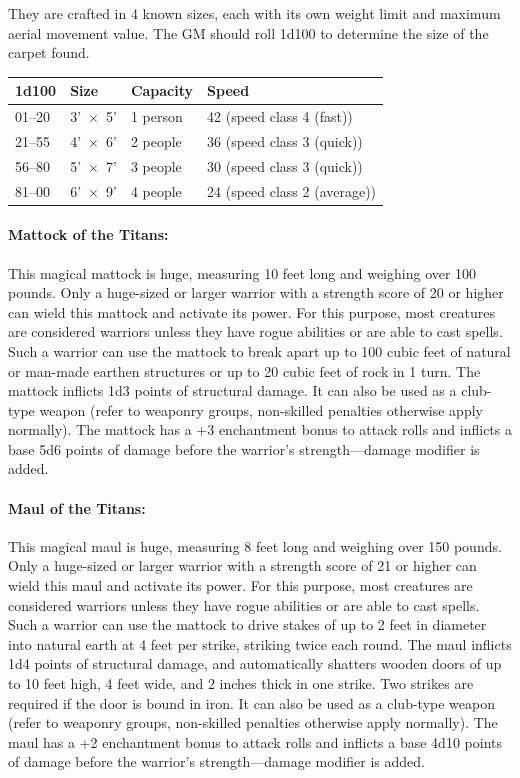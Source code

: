 \begin{multicols}{2}
They are crafted in 4 known sizes, each with its own weight limit and maximum aerial movement value.  The GM should roll 1d100 to determine the size of the carpet found.

\noindent \begin{tabular}{|p{}|p{}|p{}|p{}|}
\hline
1d100	& Size	& Capacity	& Speed \\
\hline\hline
\rowcolor[gray]{.9}01--20	& 3'~$\times$~5'	& 1 person	& 42 (speed class 4 (fast)) \\
21--55	& 4'~$\times$~6'	& 2 people	& 36 (speed class 3 (quick)) \\
\rowcolor[gray]{.9}56--80	& 5'~$\times$~7'	& 3 people	& 30 (speed class 3 (quick)) \\
81--00	& 6'~$\times$~9'	& 4 people	& 24 (speed class 2 (average)) \\
\hline
\end{tabular}

\paragraph{Mattock of the Titans:} This magical mattock is huge, measuring 10 feet long and weighing over 100 pounds.  Only a huge-sized or larger warrior with a strength score of 20 or higher can wield this mattock and activate its power.  For this purpose, most creatures are considered warriors unless they have rogue abilities or are able to cast spells.  Such a warrior can use the mattock to break apart up to 100 cubic feet of natural or man-made earthen structures or up to 20 cubic feet of rock in 1 turn.  The mattock inflicts 1d3 points of structural damage.  It can also be used as a club-type weapon (refer to weaponry groups, non-skilled penalties otherwise apply normally).  The mattock has a +3 enchantment bonus to attack rolls and inflicts a base 5d6 points of damage before the warrior's strength---damage modifier is added.

\paragraph{Maul of the Titans:} This magical maul is huge, measuring 8 feet long and weighing over 150 pounds.  Only a huge-sized or larger warrior with a strength score of 21 or higher can wield this maul and activate its power.  For this purpose, most creatures are considered warriors unless they have rogue abilities or are able to cast spells.  Such a warrior can use the mattock to drive stakes of up to 2 feet in diameter into natural earth at 4 feet per strike, striking twice each round.  The maul inflicts 1d4 points of structural damage, and automatically shatters wooden doors of up to 10 feet high, 4 feet wide, and 2 inches thick in one strike.  Two strikes are required if the door is bound in iron.  It can also be used as a club-type weapon (refer to weaponry groups, non-skilled penalties otherwise apply normally).  The maul has a +2 enchantment bonus to attack rolls and inflicts a base 4d10 points of damage before the warrior's strength---damage modifier is added.


\end{multicols}
